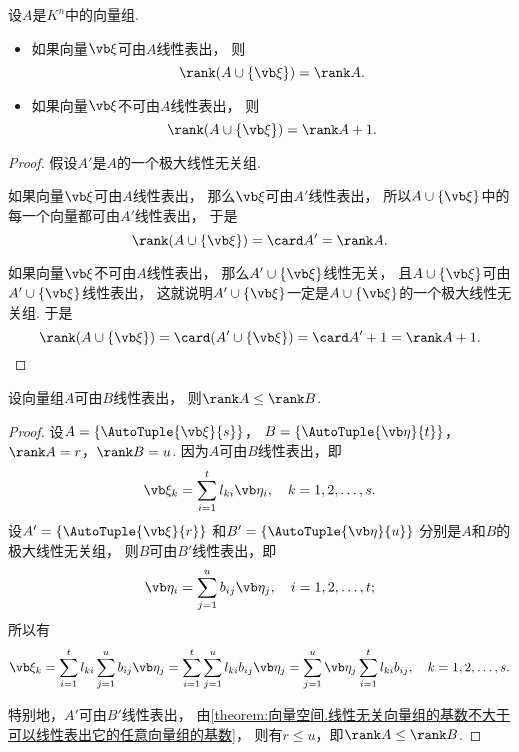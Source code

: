 \begin{proposition}\label{theorem:向量组的秩.并集的秩}
设\(A\)是\(K^n\)中的向量组.
\begin{itemize}
	\item 如果向量\(\a\)可由\(A\)线性表出，
	则\[
		\rank(A \cup \{\a\}) = \rank A.
	\]

	\item 如果向量\(\a\)不可由\(A\)线性表出，
	则\[
		\rank(A \cup \{\a\}) = \rank A + 1.
	\]
\end{itemize}
\begin{proof}
假设\(A'\)是\(A\)的一个极大线性无关组.

如果向量\(\a\)可由\(A\)线性表出，
那么\(\a\)可由\(A'\)线性表出，
所以\(A \cup \{\a\}\)中的每一个向量都可由\(A'\)线性表出，
于是\[
	\rank(A \cup \{\a\})
	= \card A'
	= \rank A.
\]

如果向量\(\a\)不可由\(A\)线性表出，
那么\(A' \cup \{\a\}\)线性无关，
且\(A \cup \{\a\}\)可由\(A' \cup \{\a\}\)线性表出，
这就说明\(A' \cup \{\a\}\)一定是\(A \cup \{\a\}\)的一个极大线性无关组.
于是\[
	\rank(A \cup \{\a\})
	= \card(A' \cup \{\a\})
	= \card A' + 1
	= \rank A + 1.
	\qedhere
\]
\end{proof}
\end{proposition}


\begin{theorem}\label{theorem:向量空间.向量组的秩的比较}
设向量组\(A\)可由\(B\)线性表出，
则\(\rank A \leq \rank B\).
\begin{proof}
设\(A=\{\AutoTuple{\a}{s}\}\)，
\(B=\{\AutoTuple{\b}{t}\}\)，
\(\rank A = r\)，\(\rank B = u\).
因为\(A\)可由\(B\)线性表出，即\[
	\a_k = \sum_{i=1}^t l_{ki} \b_i,
	\quad k=1,2,\dotsc,s.
\]
设\(A'=\{\AutoTuple{\a}{r}\}\)%
和\(B'=\{\AutoTuple{\b}{u}\}\)%
分别是\(A\)和\(B\)的极大线性无关组，
则\(B\)可由\(B'\)线性表出，即\[
	\b_i = \sum_{j=1}^u b_{ij} \b_j,
	\quad i=1,2,\dotsc,t;
\]
所以有\[
	\a_k = \sum_{i=1}^t l_{ki} \sum_{j=1}^u b_{ij} \b_j
	= \sum_{i=1}^t \sum_{j=1}^u l_{ki} b_{ij} \b_j
	= \sum_{j=1}^u \b_j \sum_{i=1}^t l_{ki} b_{ij},
	\quad k=1,2,\dotsc,s.
\]

特别地，\(A'\)可由\(B'\)线性表出，
由\cref{theorem:向量空间.线性无关向量组的基数不大于可以线性表出它的任意向量组的基数}，
则有\(r \leq u\)，即\(\rank A \leq \rank B\).
\end{proof}
\end{theorem}

